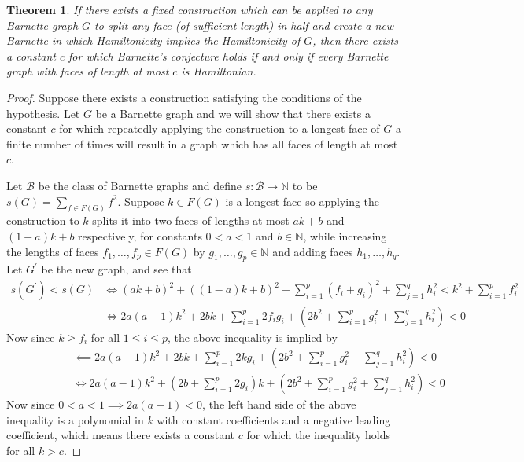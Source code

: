 \documentclass{scrartcl}
\theoremstyle{definition}
\theoremstyle{plain}
\newtheorem{theorem}{Theorem}
\begin{document}
\begin{theorem}
    If there exists a fixed construction which can be applied to any Barnette graph $G$ to split
    any face (of sufficient length) in half and create a new Barnette in which Hamiltonicity
    implies the Hamiltonicity of $G$, then there exists a constant $c$ for which Barnette's
    conjecture holds if and only if every Barnette graph with faces of length at most $c$ is
    Hamiltonian.
\end{theorem}

\begin{proof}
    Suppose there exists a construction satisfying the conditions of the hypothesis.
    Let $G$ be a Barnette graph and we will show that there exists a constant $c$ for which
    repeatedly applying the construction to a longest face of $G$ a finite number of times will
    result in a graph which has all faces of length at most $c$.

    Let $\mathcal{B}$ be the class of Barnette graphs and define $s:\mathcal{B}\to \mathbb{N}$ to
    be $s(G)=\sum_{f\in F(G)}f^2$.
    Suppose $k\in F(G)$ is a longest face so applying the construction to $k$ splits it into two
    faces of lengths at most $ak+b$ and $(1-a)k+b$ respectively, for constants $0<a<1$ and
    $b\in\mathbb{N}$, while increasing the lengths of faces $f_1,\dots,f_p\in F(G)$ by
    $g_1,\dots,g_p\in\mathbb{N}$ and adding faces $h_1,\dots,h_q$.
    Let $G^\prime$ be the new graph, and see that
    \begin{align*}
        s(G^\prime)<s(G)
        &\iff (ak+b)^2+((1-a)k+b)^2+\sum_{i=1}^p(f_i+g_i)^2+\sum_{j=1}^qh_i^2<k^2+\sum_{i=1}^pf_i^2 \\
        &\iff 2a(a-1)k^2+2bk+\sum_{i=1}^p2f_ig_i+\left(2b^2+\sum_{i=1}^pg_i^2+\sum_{j=1}^qh_i^2\right)<0
    \end{align*}
    Now since $k\geq f_i$ for all $1\leq i\leq p$, the above inequality is implied by
    \begin{align*}
        \phantom{-----}
        &\impliedby 2a(a-1)k^2+2bk+\sum_{i=1}^p2kg_i+\left(2b^2+\sum_{i=1}^pg_i^2+\sum_{j=1}^qh_i^2\right)<0 \\
        &\iff 2a(a-1)k^2+\left(2b+\sum_{i=1}^p 2g_i\right)k+\left(2b^2+\sum_{i=1}^pg_i^2+\sum_{j=1}^qh_i^2\right)<0
    \end{align*}
    Now since $0<a<1\implies 2a(a-1)<0$, the left hand side of the above inequality is a
    polynomial in $k$ with constant coefficients and a negative leading coefficient, which means
    there exists a constant $c$ for which the inequality holds for all $k>c$.


\end{proof}
\end{document}
